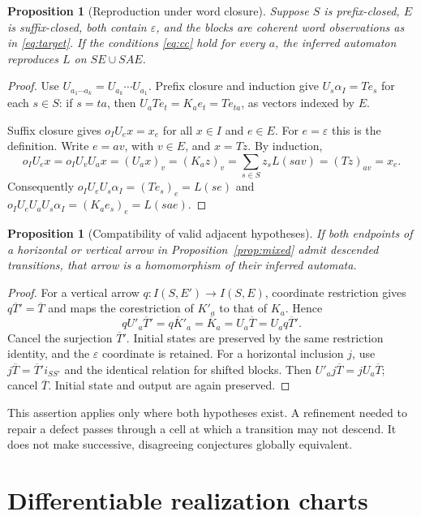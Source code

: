 \documentclass[11pt]{article}
\newtheorem{proposition}[theorem]{Proposition}
\theoremstyle{definition}
\begin{document}
\begin{proposition}[Reproduction under word closure]\label{prop:reproduction}
Suppose $S$ is prefix-closed, $E$ is suffix-closed, both contain
$\varepsilon$, and the blocks are coherent word observations as in
\eqref{eq:target}. If the conditions \eqref{eq:cc} hold for every $a$, the
inferred automaton reproduces $L$ on $SE\cup SAE$.
\end{proposition}
\begin{proof}
Use $U_{a_1\cdots a_k}=U_{a_k}\cdots U_{a_1}$. Prefix closure and induction
give $U_s\alpha_I=T e_s$ for each $s\in S$: if $s=ta$, then
$U_aT e_t=K_a e_t=T e_{ta}$, as vectors indexed by $E$.

Suffix closure gives $o_IU_e x=x_e$ for all $x\in I$ and $e\in E$.
For $e=\varepsilon$ this is the definition. Write $e=av$, with $v\in E$,
and $x=Tz$. By induction,
\[
o_IU_e x=o_IU_vU_a x=(U_a x)_v
=(K_a z)_v=\sum_{s\in S}z_sL(sav)=(Tz)_{av}=x_e.
\]
Consequently $o_IU_eU_s\alpha_I=(T e_s)_e=L(se)$ and
$o_IU_eU_aU_s\alpha_I=(K_a e_s)_e=L(sae)$.
\end{proof}

\begin{proposition}[Compatibility of valid adjacent hypotheses]\label{prop:intertwine-grid}
If both endpoints of a horizontal or vertical arrow in
Proposition~\ref{prop:mixed} admit descended transitions, that arrow is a
homomorphism of their inferred automata.
\end{proposition}
\begin{proof}
For a vertical arrow $q:I(S,E')\to I(S,E)$, coordinate restriction gives
$q\overline T'=\overline T$ and maps the corestriction of $K'_a$ to that of
$K_a$. Hence
\[
qU'_a\overline T'=q\overline K'_a
=\overline K_a=U_a\overline T=U_aq\overline T'.
\]
Cancel the surjection $\overline T'$. Initial states are preserved by the same
restriction identity, and the $\varepsilon$ coordinate is retained. For a
horizontal inclusion $j$, use
$j\overline T=\overline T'i_{SS'}$ and the identical relation for shifted
blocks. Then $U'_aj\overline T=jU_a\overline T$; cancel $\overline T$.
Initial state and output are again preserved.
\end{proof}

This assertion applies only where both hypotheses exist. A refinement needed
to repair a defect passes through a cell at which a transition may not descend.
It does not make successive, disagreeing conjectures globally equivalent.

\section{Differentiable realization charts}
\end{document}
